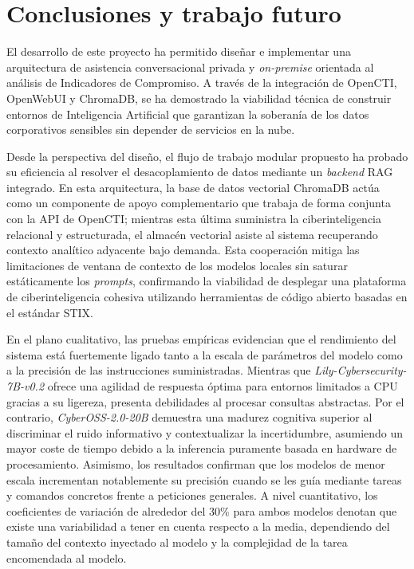 \documentclass[12pt]{report}
\begin{document}
\newpage
\chapter{Conclusiones y trabajo futuro}
\label{chap:conclusiones}
El desarrollo de este proyecto ha permitido diseñar e implementar una arquitectura de asistencia conversacional privada y \textit{on-premise} orientada al análisis de Indicadores de Compromiso. A través de la integración de OpenCTI, OpenWebUI y ChromaDB, se ha demostrado la viabilidad técnica de construir entornos de Inteligencia Artificial que garantizan la soberanía de los datos corporativos sensibles sin depender de servicios en la nube.

Desde la perspectiva del diseño, el flujo de trabajo modular propuesto ha probado su eficiencia al resolver el desacoplamiento de datos mediante un \textit{backend} RAG integrado. En esta arquitectura, la base de datos vectorial ChromaDB actúa como un componente de apoyo complementario que trabaja de forma conjunta con la API de OpenCTI; mientras esta última suministra la ciberinteligencia relacional y estructurada, el almacén vectorial asiste al sistema recuperando contexto analítico adyacente bajo demanda. Esta cooperación mitiga las limitaciones de ventana de contexto de los modelos locales sin saturar estáticamente los \textit{prompts}, confirmando la viabilidad de desplegar una plataforma de ciberinteligencia cohesiva utilizando herramientas de código abierto basadas en el estándar STIX.

En el plano cualitativo, las pruebas empíricas evidencian que el rendimiento del sistema está fuertemente ligado tanto a la escala de parámetros del modelo como a la precisión de las instrucciones suministradas. Mientras que \textit{Lily-Cybersecurity-7B-v0.2} ofrece una agilidad de respuesta óptima para entornos limitados a CPU gracias a su ligereza, presenta debilidades al procesar consultas abstractas. Por el contrario, \textit{CyberOSS-2.0-20B} demuestra una madurez cognitiva superior al discriminar el ruido informativo y contextualizar la incertidumbre, asumiendo un mayor coste de tiempo debido a la inferencia puramente basada en hardware de procesamiento. Asimismo, los resultados confirman que los modelos de menor escala incrementan notablemente su precisión cuando se les guía mediante tareas y comandos concretos frente a peticiones generales. A nivel cuantitativo, los coeficientes de variación de alrededor del 30\% para ambos modelos denotan que existe una variabilidad a tener en cuenta respecto a la media, dependiendo del tamaño del contexto inyectado al modelo y la complejidad de la tarea encomendada al modelo.
\end{document}
